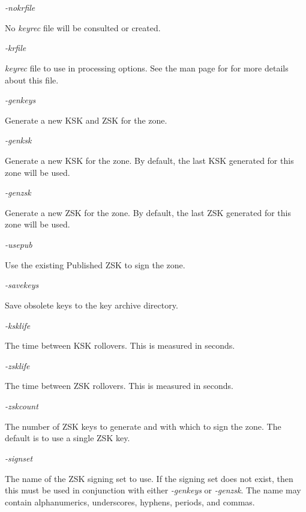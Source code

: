 \begin{description}

\item {\it -nokrfile}\verb" "

No {\it keyrec} file will be consulted or created.

\item {\it -krfile}\verb" "

{\it keyrec} file to use in processing options.  See the man page for
 for more details about this file.

\item {\it -genkeys}\verb" "

Generate a new KSK and ZSK for the zone.

\item {\it -genksk}\verb" "

Generate a new KSK for the zone.  By default, the last KSK generated for this
zone will be used.

\item {\it -genzsk}\verb" "

Generate a new ZSK for the zone.  By default, the last ZSK generated for this
zone will be used.

\item {\it -usepub}\verb" "

Use the existing Published ZSK to sign the zone.

\item {\it -savekeys}\verb" "

Save obsolete keys to the key archive directory.

\item {\it -ksklife}\verb" "

The time between KSK rollovers.  This is measured in seconds.

\item {\it -zsklife}\verb" "

The time between ZSK rollovers.  This is measured in seconds.

\item {\it -zskcount}\verb" "

The number of ZSK keys to generate and with which to sign the zone.  The
default is to use a single ZSK key.

\item {\it -signset}\verb" "

The name of the ZSK signing set to use.  If the signing set does not exist,
then this must be used in conjunction with either {\it -genkeys} or {\it
-genzsk}.  The name may contain alphanumerics, underscores, hyphens, periods,
and commas.


\end{description}
